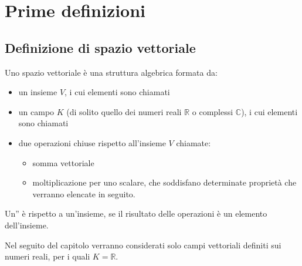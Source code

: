 \documentclass[letterpaper,10pt,italian]{jupyterBook}
\begin{document}
\section{Prime definizioni}
\label{\detokenize{ch/algebra/vector-algebra-def:prime-definizioni}}\label{\detokenize{ch/algebra/vector-algebra-def:math-hs-algebra-vector-def}}\label{\detokenize{ch/algebra/vector-algebra-def::doc}}

\subsection{Definizione di spazio vettoriale}
\label{\detokenize{ch/algebra/vector-algebra-def:definizione-di-spazio-vettoriale}}
\sphinxAtStartPar
Uno spazio vettoriale è una struttura algebrica formata da:
\begin{itemize}
\item {} 
\sphinxAtStartPar
un insieme \(V\), i cui elementi sono chiamati 

\item {} 
\sphinxAtStartPar
un campo \(K\) (di solito quello dei numeri reali \(\mathbb{R}\) o complessi \(\mathbb{C}\)), i cui elementi sono chiamati 

\item {} 
\sphinxAtStartPar
due operazioni chiuse rispetto all’insieme \(V\) chiamate:
\begin{itemize}
\item {} 
\sphinxAtStartPar
somma vettoriale

\item {} 
\sphinxAtStartPar
moltiplicazione per uno scalare,
che soddisfano determinate proprietà che verranno elencate in seguito.

\end{itemize}

\end{itemize}

\sphinxAtStartPar
Un” è  rispetto a un’insieme, se il risultato delle operazioni è un elemento dell’insieme.

\sphinxAtStartPar
Nel seguito del capitolo verranno considerati solo campi vettoriali definiti sui numeri reali, per i quali \(K = \mathbb{R}\).
\end{document}
